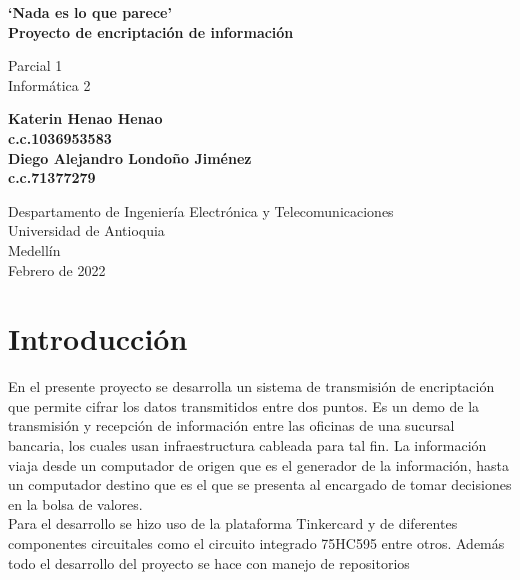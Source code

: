 \documentclass{article}
\begin{document}
\begin{titlepage}
    \begin{center}
        \vspace*{2cm}

        \Huge
        \textbf{`Nada es lo que parece' \\
        Proyecto de encriptación de información}

        \vspace{0.5cm}
        \LARGE
        Parcial 1\\
        Informática 2



        \vspace{2,5cm}

        \textbf{
        Katerin Henao Henao\\
        c.c.1036953583\\
        Diego Alejandro Londoño Jiménez\\
        c.c.71377279\\
        }

        \vfill

        \vspace{2,5cm}

        \Large
        Despartamento de Ingeniería Electrónica y Telecomunicaciones\\
        Universidad de Antioquia\\
        Medellín\\
        Febrero de 2022

    \end{center}
\end{titlepage}

\tableofcontents
\newpage
\section{Introducción}
\label{intro}
En el presente proyecto se desarrolla un sistema de transmisión de encriptación que permite cifrar los datos transmitidos entre dos puntos. Es un demo de la transmisión y recepción de información entre las oficinas de una sucursal bancaria, los cuales usan infraestructura cableada para tal fin. La información viaja desde un computador de origen que es el generador de la información, hasta un computador destino que es el que se presenta al encargado de tomar decisiones en la bolsa de valores. \\
Para el desarrollo se hizo uso de la plataforma Tinkercard y de diferentes componentes circuitales como el circuito integrado 75HC595 entre otros. Además todo el desarrollo del proyecto se hace con manejo de repositorios
\end{document}

